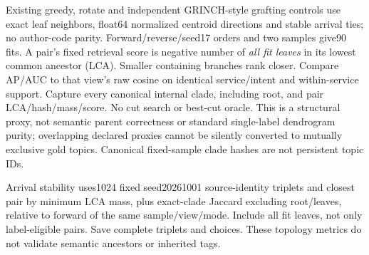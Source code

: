 \documentclass[11pt]{article}
\begin{document}
Existing greedy, rotate and independent GRINCH-style grafting controls\cite{grinch}
use exact leaf neighbors, float64 normalized centroid directions and stable
arrival ties; no author-code parity. Forward/reverse/seed17 orders and two samples
give90 fits. A pair's fixed retrieval score is negative number of \emph{all fit
leaves} in its lowest common ancestor (LCA). Smaller containing branches rank
closer. Compare AP/AUC to that view's raw cosine on identical service/intent and
within-service support. Capture every canonical internal clade, including root,
and pair LCA/hash/mass/score. No cut search or best-cut oracle. This is a structural
proxy, not semantic parent correctness or standard single-label dendrogram purity;
overlapping declared proxies cannot be silently converted to mutually exclusive
gold topics. Canonical fixed-sample clade hashes are not persistent topic IDs.

Arrival stability uses1024 fixed seed20261001 source-identity triplets and closest
pair by minimum LCA mass, plus exact-clade Jaccard excluding root/leaves, relative
to forward of the same sample/view/mode. Include all fit leaves, not only
label-eligible pairs. Save complete triplets and choices. These topology metrics
do not validate semantic ancestors or inherited tags.
\end{document}
